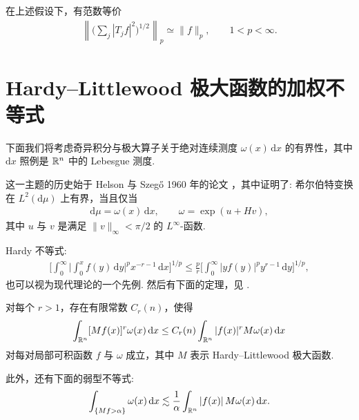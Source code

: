 \begin{corollary}\label{cor:4.8}
在上述假设下，有范数等价
\begin{align*}
  \left\|\Big(\sum_{j}|T_{j}f|^{2}\Big)^{1/2}\right\|_{p}\simeq\|f\|_{p},\qquad 1<p<\infty.
\end{align*}
\end{corollary}

\section{Hardy--Littlewood 极大函数的加权不等式}

下面我们将考虑奇异积分与极大算子关于绝对连续测度 $\omega(x)\,\mathrm{d}x$ 的有界性，其中 $\mathrm{d}x$ 照例是 $\mathbb{R}^n$ 中的 Lebesgue 测度.

这一主题的历史始于 Helson 与 Szegő 1960 年的论文 \cite{b90}，其中证明了: 希尔伯特变换在 $L^2(\mathrm{d}\mu)$ 上有界，当且仅当
\begin{align*}
  \mathrm{d}\mu=\omega(x)\,\mathrm{d}x,\qquad
  \omega=\exp(u+H v),
\end{align*}
其中 $u$ 与 $v$ 是满足 $\|v\|_\infty < \pi/2$ 的 $L^\infty$-函数.

Hardy 不等式:
\begin{align*}
  \Big[\int_{0}^{\infty}\Big|\int_{0}^{x}f(y)\,\mathrm{d}y\Big|^{p}x^{-r-1}\,\mathrm{d}x\Big]^{1/p}
  \leq\frac{p}{r}\Big[\int_{0}^{\infty}|y f(y)|^{p}y^{r-1}\,\mathrm{d}y\Big]^{1/p},
\end{align*}
也可以视为现代理论的一个先例. 然后有下面的定理，见 \cite{b89}.

\begin{theorem}\label{thm:4.9}
对每个 $r > 1$，存在有限常数 $C_r(n)$，使得
\begin{align*}
  \int_{\mathbb{R}^{n}}[Mf(x)]^{r}\omega(x)\,\mathrm{d}x\leq C_{r}(n)\int_{\mathbb{R}^{n}}|f(x)|^{r}M\omega(x)\,\mathrm{d}x
\end{align*}
对每对局部可积函数 $f$ 与 $\omega$ 成立，其中 $M$ 表示 Hardy--Littlewood 极大函数.
\end{theorem}

此外，还有下面的弱型不等式:
\begin{align*}
  \int_{\left\{M f>\alpha\right\}}\omega(x)\,\mathrm{d}x\lesssim\frac{1}{\alpha}\int_{\mathbb{R}^{n}}\left|f(x)\right|M\omega(x)\,\mathrm{d}x.
\end{align*}


